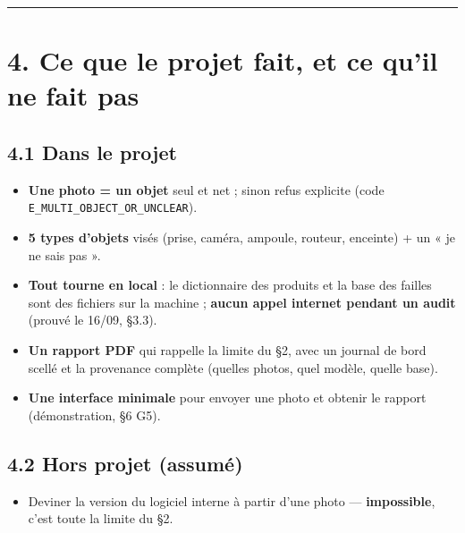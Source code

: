 \documentclass[11pt,a4paper]{article}
\begin{document}
\medskip\hrule\medskip
\section*{4. Ce que le projet fait, et ce qu'il ne fait pas}
\subsection*{4.1 Dans le projet}
\begin{itemize}  \item \textbf{Une photo = un objet} seul et net ; sinon refus explicite (code \texttt{E\_\allowbreak{}MULTI\_\allowbreak{}OBJECT\_\allowbreak{}OR\_\allowbreak{}UNCLEAR}).
\end{itemize}

\begin{itemize}  \item \textbf{5 types d'objets} visés (prise, caméra, ampoule, routeur, enceinte) + un « je ne sais pas ».
\end{itemize}

\begin{itemize}  \item \textbf{Tout tourne en local} : le dictionnaire des produits et la base des failles sont des fichiers sur la machine ; \textbf{aucun appel internet pendant un audit} (prouvé le 16/09, §3.3).
\end{itemize}

\begin{itemize}  \item \textbf{Un rapport PDF} qui rappelle la limite du §2, avec un journal de bord scellé et la provenance complète (quelles photos, quel modèle, quelle base).
\end{itemize}

\begin{itemize}  \item \textbf{Une interface minimale} pour envoyer une photo et obtenir le rapport (démonstration, §6 G5).
\end{itemize}

\subsection*{4.2 Hors projet (assumé)}
\begin{itemize}  \item Deviner la version du logiciel interne à partir d'une photo — \textbf{impossible}, c'est toute la limite du §2.
\end{itemize}
\end{document}
